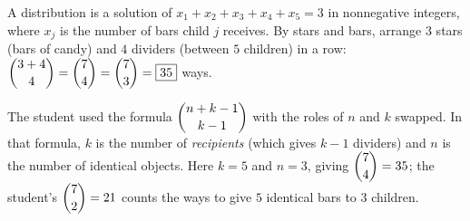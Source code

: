A distribution is a solution of $x_1+x_2+x_3+x_4+x_5=3$ in nonnegative integers, where $x_j$ is the number of bars child $j$ receives. By stars and bars, arrange $3$ stars (bars of candy) and $4$ dividers (between $5$ children) in a row: $\dbinom{3+4}{4}=\dbinom74=\dbinom73=\boxed{35}$ ways.

The student used the formula $\dbinom{n+k-1}{k-1}$ with the roles of $n$ and $k$ swapped. In that formula, $k$ is the number of \emph{recipients} (which gives $k-1$ dividers) and $n$ is the number of identical objects. Here $k=5$ and $n=3$, giving $\dbinom{7}{4}=35$; the student's $\dbinom72=21$ counts the ways to give $5$ identical bars to $3$ children.
